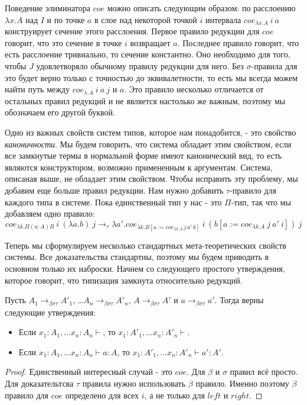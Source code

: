 \documentclass{amsart}
\theoremstyle{definition}
\theoremstyle{remark}
\newcommand{\bs}{\beta\sigma}
\newcommand{\bst}{\bs\tau}
\newcommand{\rbst}{\to_{\bst}}
\numberwithin{figure}{section}
\begin{document}
Поведение элиминатора $coe$ можно описать следующим образом:
по расслоению $\lambda x. A$ над $I$ и по точке $a$ в слое над некоторой точкой $i$ интервала $coe_{\lambda x. A}\ i\ a$ конструирует сечение этого расслоения.
Первое правило редукции для $coe$ говорит, что это сечение в точке $i$ возвращает $a$.
Последнее правило говорит, что есть расслоение тривиально, то сечение константно.
Оно необходимо для того, чтобы $J$ удовлетворяло обычному правилу редукции для него.
Без $\sigma$-правила для это будет верно только с точностью до эквивалетности, то есть мы всегда можем найти путь между $coe_{\lambda. A}\ i\ a\ j$ и $a$.
Это правило несколько отличается от остальных правил редукций и не является настолько же важным, поэтому мы обозначаем его другой буквой.

Одно из важных свойств систем типов, которое нам понадобится, - это свойство \emph{каноничности}.
Мы будем говорить, что система обладает этим свойством, если все замкнутые термы в нормальной форме имеют канонический вид,
    то есть являются конструктором, возможно примененным к аргументам.
Система, описаная выше, не обладает этим свойством.
Чтобы исправить эту проблему, мы добавим еще больше правил редукции.
Нам нужно добавить $\tau$-правило для каждого типа в системе.
Пока единственный тип у нас - это $\Pi$-тип, так что мы добавляем одно правило:
\[ coe_{\lambda k. \Pi (a : A) B}\ i\ (\lambda a. b)\ j \to_\tau \lambda a'. coe_{\lambda k. B[a := coe_{\lambda k. A}\,j\,a'\,k]}\ i\ (b[a := coe_{\lambda k. A}\ j\ a'\ i])\ j \]

Теперь мы сформулируем несколько стандартных мета-теоретических свойств системы.
Все доказательства стандартны, поэтому мы будем приводить в основном только их наброски.
Начнем со следующего простого утверждения, которое говорит, что типизация замкнута относительно редукций.
\begin{prop}
Пусть $A_1 \rbst A'_1$, \ldots $A_n \rbst A'_n$, $A \rbst A'$ и $a \rbst a'$.
Тогда верны следующие утверждения:
\begin{itemize}
\item Если $x_1 : A_1, \ldots x_n : A_n \vdash$, то $x_1 : A'_1, \ldots x_n : A'_n \vdash$.
\item Если $x_1 : A_1, \ldots x_n : A_n \vdash a : A$, то $x_1 : A'_1, \ldots x_n : A'_n \vdash a' : A'$.
\end{itemize}
\end{prop}
\begin{proof}
Единственный интересный случай - это $coe$.
Для $\beta$ и $\sigma$ правил всё просто.
Для доказательтсва $\tau$ правила нужно использовать $\beta$ правило.
Именно поэтому $\beta$ правило для $coe$ определено для всех $i$, а не только для $left$ и $right$.
\end{proof}
\end{document}
